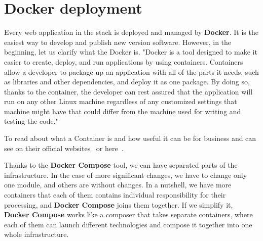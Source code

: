\section{Docker deployment}\label{sec:docker-deployment}
Every web application in the stack is deployed and managed by \textbf{Docker}.
It is the easiest way to develop and publish new version software.
However, in the beginning, let us clarify what the Docker is.
"Docker is a tool designed to make it easier to create, deploy, and run applications by using containers.
Containers allow a developer to package up an application with all of the parts it needs, such as libraries and other dependencies, and deploy it as one package.
By doing so, thanks to the container, the developer can rest assured that the application will run on any other Linux machine regardless of any customized settings that machine might have that could differ from the machine used for writing and testing the code."\cite{dockerDescription}

To read about what a Container is and how useful it can be for business and can see on their official websites~\cite{dockerContainer} or here~\cite{dockerDescription}.

Thanks to the \textbf{Docker Compose} tool, we can have separated parts of the infrastructure.
In the case of more significant changes, we have to change only one module, and others are without changes.
In a nutshell, we have more containers that each of them contains individual responsibility for their processing, and \textbf{Docker Compose} joins them together.
If we simplify it, \textbf{Docker Compose} works like a composer that takes separate containers, where each of them can launch different technologies and compose it together into one whole infrastructure.\cite{dockerCompose}

